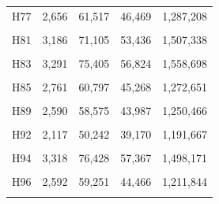 \documentclass[
  a4paper,
  titlepage]{article}
\begin{document}
\begin{longtable}[t]{lllll}
H77 & 2,656 & 61,517 & 46,469 & 1,287,208\\
 
\cellcolor{gray!6}{H80} & \cellcolor{gray!6}{1,992} & \cellcolor{gray!6}{45,042} & \cellcolor{gray!6}{34,114} & \cellcolor{gray!6}{965,197}\\
 
H81 & 3,186 & 71,105 & 53,436 & 1,507,338\\
 
\cellcolor{gray!6}{H82} & \cellcolor{gray!6}{1,901} & \cellcolor{gray!6}{44,366} & \cellcolor{gray!6}{34,015} & \cellcolor{gray!6}{972,451}\\
 
H83 & 3,291 & 75,405 & 56,824 & 1,558,698\\
 
\cellcolor{gray!6}{H84} & \cellcolor{gray!6}{1,971} & \cellcolor{gray!6}{45,737} & \cellcolor{gray!6}{35,770} & \cellcolor{gray!6}{1,069,841}\\
 
H85 & 2,761 & 60,797 & 45,268 & 1,272,651\\
 
\cellcolor{gray!6}{H87} & \cellcolor{gray!6}{2,773} & \cellcolor{gray!6}{63,267} & \cellcolor{gray!6}{47,352} & \cellcolor{gray!6}{1,278,819}\\
 
H89 & 2,590 & 58,575 & 43,987 & 1,250,466\\
 
\cellcolor{gray!6}{H91} & \cellcolor{gray!6}{2,056} & \cellcolor{gray!6}{47,707} & \cellcolor{gray!6}{36,190} & \cellcolor{gray!6}{996,879}\\
 
H92 & 2,117 & 50,242 & 39,170 & 1,191,667\\
 
\cellcolor{gray!6}{H93} & \cellcolor{gray!6}{2,194} & \cellcolor{gray!6}{49,993} & \cellcolor{gray!6}{37,649} & \cellcolor{gray!6}{1,010,177}\\
 
H94 & 3,318 & 76,428 & 57,367 & 1,498,171\\
 
\cellcolor{gray!6}{H95} & \cellcolor{gray!6}{2,364} & \cellcolor{gray!6}{54,404} & \cellcolor{gray!6}{41,044} & \cellcolor{gray!6}{1,162,239}\\
 
H96 & 2,592 & 59,251 & 44,466 & 1,211,844\\
 
\cellcolor{gray!6}{H97} & \cellcolor{gray!6}{1,961} & \cellcolor{gray!6}{45,616} & \cellcolor{gray!6}{34,951} & \cellcolor{gray!6}{1,037,370}\\
 

\end{longtable}
\end{document}
